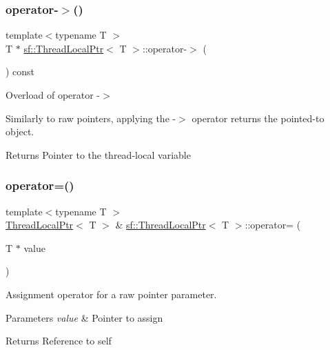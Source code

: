 \subsubsection{\texorpdfstring{operator-\/$>$()}{operator->()}}
{\footnotesize\ttfamily template$<$typename T $>$ \\
T $\ast$ \mbox{\hyperlink{classsf_1_1_thread_local_ptr}{sf\+::\+Thread\+Local\+Ptr}}$<$ T $>$\+::operator-\/$>$ (\begin{DoxyParamCaption}{ }\end{DoxyParamCaption}) const}



Overload of operator -\/$>$ 

Similarly to raw pointers, applying the -\/$>$ operator returns the pointed-\/to object.

\begin{DoxyReturn}{Returns}
Pointer to the thread-\/local variable \begin{DoxyVerb}\end{DoxyVerb}
 
\end{DoxyReturn}
\mbox{\label{classsf_1_1_thread_local_ptr_a14dcf1cdf5f6b3bcdd633014b2b671f5}} 
\subsubsection{\texorpdfstring{operator=()}{operator=()}\hspace{0.1cm}{\footnotesize\ttfamily [1/2]}}
{\footnotesize\ttfamily template$<$typename T $>$ \\
\mbox{\hyperlink{classsf_1_1_thread_local_ptr}{Thread\+Local\+Ptr}}$<$ T $>$ \& \mbox{\hyperlink{classsf_1_1_thread_local_ptr}{sf\+::\+Thread\+Local\+Ptr}}$<$ T $>$\+::operator= (\begin{DoxyParamCaption}\item[{T $\ast$}]{value }\end{DoxyParamCaption})}



Assignment operator for a raw pointer parameter. 


\begin{DoxyParams}{Parameters}
{\em value} & Pointer to assign\\
\hline
\end{DoxyParams}
\begin{DoxyReturn}{Returns}
Reference to self \begin{DoxyVerb}\end{DoxyVerb}
 
\end{DoxyReturn}
\mbox{\label{classsf_1_1_thread_local_ptr_a6792a6a808af06f0d13e3ceecf2fc947}} 
